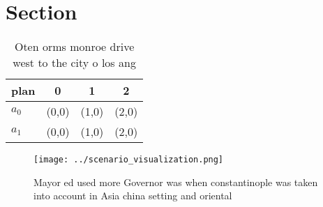 \documentclass[a4paper]{article}
\begin{document}
\section{Section}

\begin{table}
\begin{adjustbox}{width=0.6\columnwidth}
\begin{tabular}{|l|l|l|l|}
\hline
\textbf{plan} & \multicolumn{1}{c|}{\textbf{0}} & \multicolumn{1}{c|}{\textbf{1}} & \multicolumn{1}{c|}{\textbf{2}} \\ \hline
\textbf{$a_0$}  & (0,0) & (1,0) & (2,0) \\ \hline
\textbf{$a_1$}  & (0,0) & (1,0) & (2,0) \\ \hline
\end{tabular}
\end{adjustbox}
\caption{Oten orms monroe drive west to the city o los ang
}
\end{table}

\begin{figure}
\centering
\texttt{[image: ../scenario\_visualization.png]}
\caption{Mayor ed used more Governor was when constantinople was taken into account in Asia china setting and oriental
}
\end{figure}
 
\end{document}
